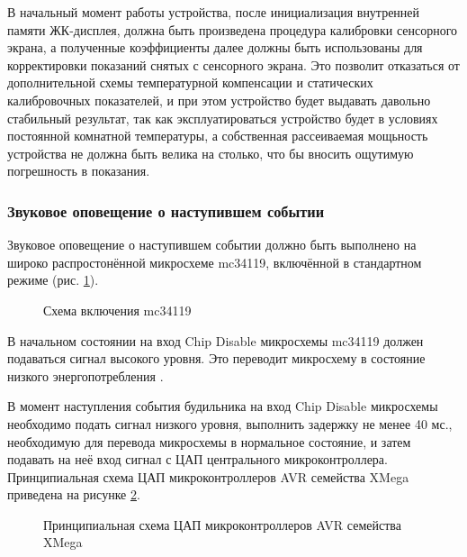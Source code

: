 \begin{par}
В начальный момент работы устройства, после инициализация внутренней памяти ЖК-дисплея, должна быть
произведена процедура калибровки сенсорного экрана, а полученные коэффициенты далее должны быть
использованы для корректировки показаний снятых с сенсорного экрана. Это позволит отказаться
от дополнительной схемы температурной компенсации и статических калибровочных показателей,
и при этом устройство будет выдавать давольно стабильный результат,
так как эксплуатироваться устройство будет в условиях постоянной комнатной температуры,
а собственная рассеиваемая мощьность устройства не должна быть велика на столько, что бы
вносить ощутимую погрешность в показания.
\end{par}


\subsubsection{Звуковое оповещение о наступившем событии}
\begin{par}
Звуковое оповещение о наступившем событии должно быть выполнено на широко распростонённой
микросхеме mc34119, включённой в стандартном режиме (рис. \ref{img:mc34119m}).
\begin{figure}[h]
	\caption{Схема включения mc34119}
	\label{img:mc34119m}
\end{figure}
\end{par}

\begin{par}
В начальном состоянии на вход Chip Disable микросхемы mc34119 должен подаваться сигнал высокого уровня.
Это переводит микросхему в состояние низкого энергопотребления \cite{mc34119}.
\end{par}

\begin{par}
В момент наступления события будильника на вход Chip Disable микросхемы необходимо подать сигнал 
низкого уровня, выполнить задержку не менее 40 мс., необходимую для перевода микросхемы в
нормальное состояние, и затем подавать на неё вход сигнал с ЦАП центрального микроконтроллера.
Принципиальная схема ЦАП микроконтроллеров AVR семейства XMega приведена на рисунке \ref{img:avrdacp}.
\begin{figure}[h]
	\caption{Принципиальная схема ЦАП микроконтроллеров AVR семейства XMega}
	\label{img:avrdacp}
\end{figure}
\end{par}

